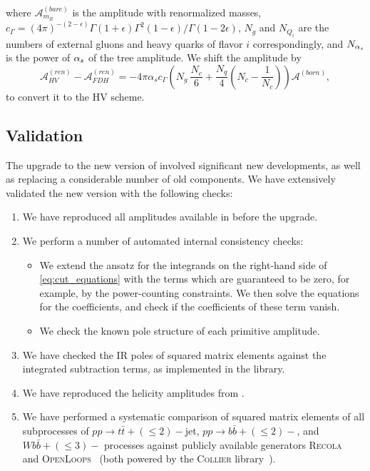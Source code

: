 where $\mathcal{A}^{(bare)}_{m_R}$ is the amplitude with renormalized masses,
$\displaystyle c_\Gamma={(4\pi)^{-(2-\epsilon)}{\Gamma(1+\epsilon)\Gamma^2(1-\epsilon)}/\Gamma(1-2\epsilon)}$,
$N_g$ and $N_{Q_i}$ are the numbers of external gluons and heavy quarks of flavor $i$ correspondingly,
and $N_{\alpha_s}$ is the power of $\alpha_s$ of the tree amplitude.
We shift \cite{Signer:2008va} the amplitude by
\begin{equation}
  \mathcal{A}^{(ren)}_{HV} - \mathcal{A}^{(ren)}_{FDH} = -4\pi \alpha_s c_\Gamma\left(N_{g}~\frac{N_c}{6} + \frac{N_q}{4}\left(N_c -\frac{1}{N_c}\right)\right)\mathcal{A}^{(born)},
  \label{schemeshift}
\end{equation}
to convert it to the HV scheme.



\subsection{Validation}

The upgrade to the new version of \BlackHat{} involved significant new developments,
as well as replacing a considerable number of old components.
We have extensively validated the new version with the following checks:
\begin{enumerate}
  \item We have reproduced all amplitudes available in \BlackHat{} before the upgrade.
  \item We perform a number of automated internal consistency checks:
    \begin{itemize}
      \item We extend the ansatz for the integrands on the right-hand side of \cref{eq:cut_equations} with the terms which are guaranteed to be zero, for example, by the power-counting constraints.
        We then solve the equations for the coefficients, and check if the coefficients of these term vanish.
      \item We check the known pole structure \cite{Catani:2000ef} of each primitive amplitude.
    \end{itemize}
  \item We have checked the IR poles of squared matrix elements against the integrated subtraction terms,
    as implemented in the \SHERPA{} library.
  \item We have reproduced the helicity amplitudes from \cite{Ellis:2008ir}.
  \item We have performed a systematic comparison of squared matrix elements 
    of all subprocesses of $pp\rightarrow t\bar t+(\leq 2)-$jet, $pp\rightarrow b\bar b+(\leq 2)-$, and
$Wb\bar b+(\leq3)-$ processes against publicly available generators 
\textsc{Recola}~\cite{Actis:2016mpe} and \textsc{OpenLoops}~\cite{Cascioli:2011va} 
(both powered by the \textsc{Collier} library~\cite{Denner:2016kdg}).
\end{enumerate}

